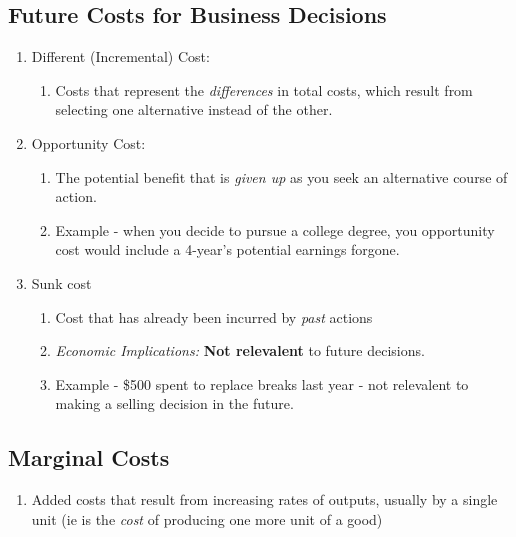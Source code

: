 \documentclass{report} %
\begin{document}
\subsection*{Future Costs for Business Decisions}
\begin{enumerate}
    \item Different (Incremental) Cost:
        \begin{enumerate}
            \item Costs that represent the \emph{differences} in total costs, which result from selecting one alternative instead of the other.
        \end{enumerate}
    \item Opportunity Cost:
        \begin{enumerate}
            \item The potential benefit that is \emph{given up} as you seek an alternative course of action.
            \item Example - when you decide to pursue a college degree, you opportunity cost would include a 4-year's potential earnings forgone.
        \end{enumerate}
    \item Sunk cost
        \begin{enumerate}
            \item Cost that has already been incurred by \emph{past} actions
            \item \emph{Economic Implications:} \textbf{Not relevalent} to future decisions.
            \item Example - \$500 spent to replace breaks last year - not relevalent to making a selling decision in the future.
        \end{enumerate}
\end{enumerate}

\subsection*{Marginal Costs}
\begin{enumerate}
    \item Added costs that result from increasing rates of outputs, usually by a single unit (ie is the \emph{cost} of producing one more unit of a good)
\end{enumerate}
\end{document}
